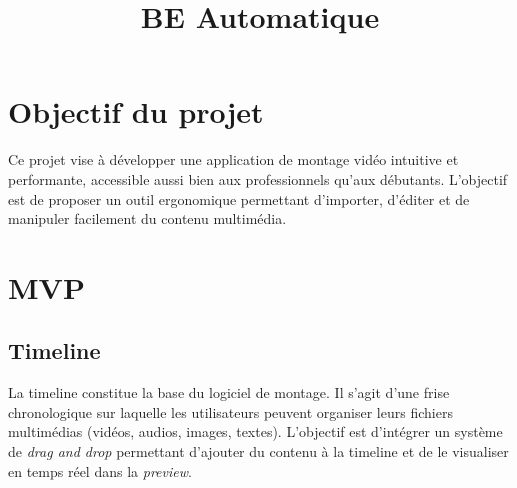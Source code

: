 \documentclass{rapport}
\title{BE Automatique} %
\begin{document}

\subject{Fonctionnalités du logiciel de montage} %



        
\buildmargins %
\buildcover %
\toc %

\section{Objectif du projet}
Ce projet vise à développer une application de montage vidéo intuitive et performante, accessible aussi bien aux professionnels qu'aux débutants. L'objectif est de proposer un outil ergonomique permettant d'importer, d'éditer et de manipuler facilement du contenu multimédia.

\section{MVP}

\subsection{Timeline}
La timeline constitue la base du logiciel de montage. Il s'agit d'une frise chronologique sur laquelle les utilisateurs peuvent organiser leurs fichiers multimédias (vidéos, audios, images, textes). L’objectif est d’intégrer un système de \textit{drag and drop} permettant d’ajouter du contenu à la timeline et de le visualiser en temps réel dans la \textit{preview}.
\end{document}
